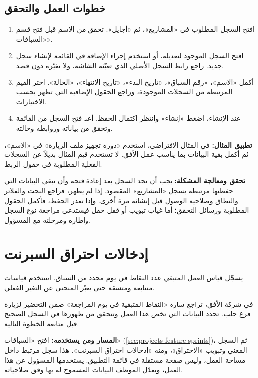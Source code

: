 \subsection{خطوات العمل والتحقق}
\begin{enumerate}
\item افتح السجل المطلوب في «المشاريع»، ثم «أجايل». تحقق من الاسم قبل فتح قسم «السباقات».
\item افتح السجل الموجود لتعديله، أو استخدم إجراء الإضافة في القائمة لإنشاء سجل جديد. راجع رابط السجل الأصلي الذي تعبّئه الشاشة، ولا تغيّره دون قصد.
\item أكمل «الاسم»، «رقم السباق»، «تاريخ البدء»، «تاريخ الانتهاء»، «الحالة». اختر القيم المرتبطة من السجلات الموجودة، وراجع الحقول الإضافية التي تظهر بحسب الاختيارات.
\item عند الإنشاء، اضغط «إنشاء» وانتظر اكتمال الحفظ. أعد فتح السجل من القائمة وتحقق من بياناته وروابطه وحالته.
\end{enumerate}

\textbf{تطبيق المثال:} في المثال الافتراضي، استخدم «دورة تجهيز ملف الزيارة» في «الاسم»، ثم أكمل بقية البيانات بما يناسب عمل الأفق. لا تستخدم قيم المثال بديلاً عن السجلات الفعلية المطلوبة في حقول الربط.

\textbf{تحقق ومعالجة المشكلة:} يجب أن تجد السجل بعد إعادة فتحه وأن تبقى البيانات التي حفظتها مرتبطة بسجل «المشاريع» المقصود. إذا لم يظهر، فراجع البحث والفلاتر والنطاق وصلاحية الوصول قبل إنشائه مرة أخرى. وإذا تعذر الحفظ، فأكمل الحقول المطلوبة ورسائل التحقق؛ أما غياب تبويب أو قفل حقل فيستدعي مراجعة نوع السجل وإطاره ومرحلته مع المسؤول.

\clearpage
\section{إدخالات احتراق السبرنت}
\label{sec:projects-feature-sprint-burndown-entries}

يسجّل قياس العمل المتبقي عدد النقاط في يوم محدد من السباق. استخدم قياسات متتابعة ومتسقة حتى يعبّر المنحنى عن التغير الفعلي.

\begin{rcnote}
في شركة الأفق، تراجع سارة «النقاط المتبقية في يوم المراجعة» ضمن التحضير لزيارة فرع حلب. تحدد البيانات التي تخص هذا العمل وتتحقق من ظهورها في السجل الصحيح قبل متابعة الخطوة التالية.
\end{rcnote}

\textbf{المسار ومن يستخدمه:} افتح «السباقات» (\ref{sec:projects-feature-sprints})، ثم السجل المعني وتبويب «الاحتراق»، ومنه «إدخالات احتراق السبرنت». هذا سجل مرتبط داخل مساحة العمل، وليس صفحة مستقلة في قائمة التطبيق. يستخدمها المسؤول عن هذا العمل، ويعدّل الموظف البيانات المسموح له بها وفق صلاحياته.

